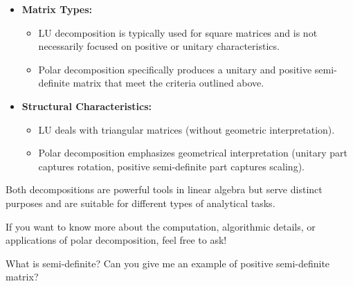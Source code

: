 \begin{airesult}
\begin{itemize}
  \item \textbf{Matrix Types:}
  \begin{itemize}
    \item LU decomposition is typically used for square matrices and is not necessarily focused on
positive or unitary characteristics.
    \item Polar decomposition specifically produces a unitary and positive semi-definite matrix that
meet the criteria outlined above.
  \end{itemize}

  \item \textbf{Structural Characteristics:}
  \begin{itemize}
    \item LU deals with triangular matrices (without geometric interpretation).
    \item Polar decomposition emphasizes geometrical interpretation (unitary part captures rotation,
positive semi-definite part captures scaling).
  \end{itemize}
\end{itemize}

Both decompositions are powerful tools in linear algebra but serve distinct purposes and are
suitable for different types of analytical tasks.

If you want to know more about the computation, algorithmic details, or applications of polar
decomposition, feel free to ask!
\end{airesult}


\begin{ai}
What is semi-definite? Can you give me an example of positive semi-definite matrix?
\end{ai}

